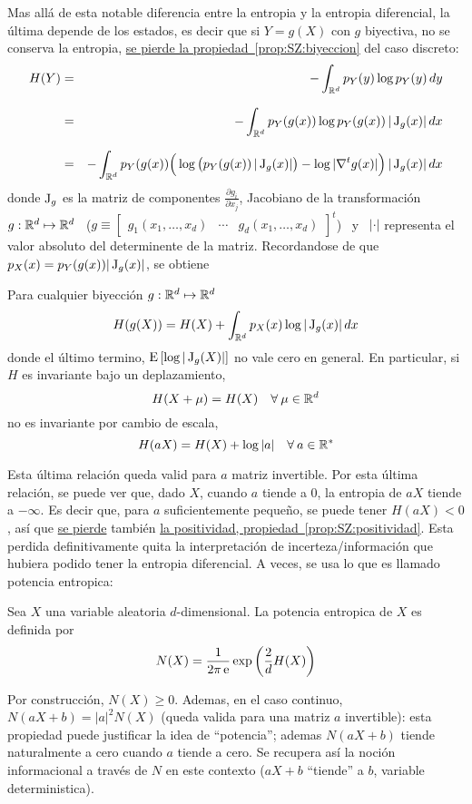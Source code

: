 Mas  all\'a  de  esta  notable  diferencia  entre  la  entropia  y  la  entropia
diferencial, la \'ultima depende de los estados,  es decir que si $Y = g(X)$ con
$g$  biyectiva,  no  se  conserva  la  entropia,  \ie  \underline{se  pierde  la
  propiedad~\ref{prop:SZ:biyeccion}}  del  caso discreto:
%
\begin{eqnarray*}
H(Y) & = & - \int_{\Rset^d} p_Y(y) \log p_Y(y) \, dy\\[2.5mm]
%
& = &  - \int_{\Rset^d} p_Y(g(x)) \log p_Y(g(x)) \, |\Jac_g(x)| \, dx\\[2.5mm]
%
& = & - \int_{\Rset^d} p_Y(g(x)) \Big( \log \big( p_Y(g(x)) \, |\Jac_g(x)| \big) -
\log |\nabla^t g(x)| \Big) \, |\Jac_g(x)| \, dx
\end{eqnarray*}
%
donde $\operatorname{J}_g$ es la  matriz de componentes $\frac{\partial g_i}{\partial x_j}$,
Jacobiano  de  la  transformaci\'on  \   $g:  \mathbb{R}^d  \mapsto  \mathbb{R}^d$  \  ($g
\equiv  \begin{bmatrix} g_1(x_1  ,  \ldots  , x_d)  &  \cdots &  g_d(x_1  , \ldots  ,
  x_d)  \end{bmatrix}^t$) \  y  \  $|\cdot|$ representa  el  valor absoluto  del
determinente   de  la  matriz.    Recordandose  de   que  $p_X(x)   =  p_Y(g(x))
|\operatorname{J}_g(x)|$, se obtiene
%
\begin{propiedadesC}\setcounter{enumi}{\value{PropBiyeccion}}
%
\item\label{prop:SZ:biyeccionC}
Para  cualquier biyecci\'on $g:  \mathbb{R}^d \mapsto  \mathbb{R}^d$
  \[
  H(g(X)) = H(X) + \int_{\mathbb{R}^d} p_X(x) \log |\operatorname{J}_g(x)| \, dx
  \]
  donde el \'ultimo termino, $\operatorname{E}\left[  \log |\operatorname{J}_g(X)| \right]$ no vale cero
  en    general.   En    particular,   si    $H$   es    invariante    bajo   un
  deplazamiento,
  \[
  H(X+\mu) = H(X) \quad \forall \: \mu \in \mathbb{R}^d
  \]
  no  es invariante  por cambio  de escala,
  \[
  H(a X) = H(X) + \log |a| \quad \forall \: a \in \mathbb{R}^*
  \]
\end{propiedadesC}
%
Esta  \'ultima relaci\'on  queda valid  para  $a$ matriz  invertible.  Por  esta
\'ultima  relaci\'on, se puede  ver que,  dado $X$,  cuando $a$  tiende a  0, la
entropia de  $a X$ tiende a  $-\infty$.  Es decir que,  para $a$ suficientemente
peque\~no,  se  puede  tener $H(a  X)  <  0$,  as\'i que  \underline{se  pierde}
tambi\'en \underline{la positividad, propiedad~\ref{prop:SZ:positividad}}.  Esta
perdida definitivamente quita la interpretaci\'on de incerteza/informaci\'on que
hubiera podido tener la entropia diferencial.  A veces, se usa lo que es llamado
potencia entropica:
%
\begin{definicion}
  Sea $X$ una  variable aleatoria $d$-dimensional. La potencia  entropica de $X$
  es definida por
  \[
  N(X) = \frac{1}{2 \pi \operatorname{e}} \exp\left( \frac2d H(X) \right)
  \]
\end{definicion}
%
\noindent Por construcci\'on,  $N(X) \ge 0$.  Ademas, en  el caso continuo, $N(a
X+b) = |a|^2 N(X)$ (queda valida para una matriz $a$ invertible): esta propiedad
puede justificar la idea de  ``potencia''; ademas $N(a X+b)$ tiende naturalmente
a cero cuando $a$ tiende a  cero.  Se recupera as\'i la noci\'on informacional a
trav\'es  de  $N$ en  este  contexto  ($a X  +  b$  ``tiende''  a $b$,  variable
deterministica).


